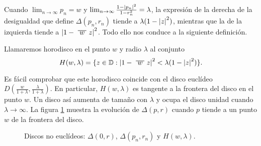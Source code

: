 Cuando $\lim_{n \to \infty} p_n = w$ y $\lim_{n \to \infty} \frac{1-\left\lvert p_n\right\rvert^2}{1-r_n^2} = \lambda$, la expresión de la derecha de la desigualdad que define $\Delta(p_n, r_n)$ tiende a $\lambda(1 - \left\lvert z\right\rvert^2)$, mientras que la de la izquierda tiende a $\abs{1 - \xbar{w}z}^2$. Todo ello nos conduce a la siguiente definición. \\

\begin{definition}
    Llamaremos horodisco en el punto $w$ y radio $\lambda$ al conjunto
    \begin{equation*}
        H(w,\lambda) = \{z \in \disk : \abs{1 - \xbar{w} z}^2 < \lambda(1 - \abs{z}^2)\}.
    \end{equation*}
\end{definition}

Es fácil comprobar que este horodisco coincide con el disco euclídeo $D(\frac{w}{1+\lambda}, \frac{\lambda}{1+\lambda})$. En particular, $H(w, \lambda)$ es tangente a la frontera del disco en el punto $w$. Un disco así aumenta de tamaño con $\lambda$ y ocupa el disco unidad cuando $\lambda \to \infty$. La figura \ref{fig:noeuclideos} muestra la evolución de $\Delta(p,r)$ cuando $p$ tiende a un punto $w$ de la frontera del disco. \\

\begin{figure}[h]{}
    \begin{minipage}[h]{0.35\textwidth}
        \centering
        \label{fig:noeuclideo1}
    \end{minipage} \hfill
    \begin{minipage}[h]{0.3\textwidth}
        \label{fig:noeuclideo2}
    \end{minipage} \hfill
    \begin{minipage}[h]{0.3\textwidth}
        \label{fig:noeuclideo3}
    \end{minipage}
    \caption{Discos no euclídeos: $\Delta(0, r)$, $\Delta(p_n, r_n)$ y $H(w, \lambda)$.}
    \label{fig:noeuclideos}
\end{figure}

